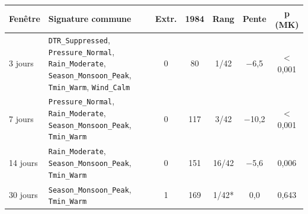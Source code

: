 \footnotesize
\begin{tabular}{l>{\raggedright\arraybackslash}p{4.6cm}ccccc}
\toprule
\rowcolor{NuitBleue!90}
\color{white}\textbf{Fenêtre} & \color{white}\textbf{Signature commune} & \color{white}\textbf{Extr.} & \color{white}\textbf{1984} & \color{white}\textbf{Rang} & \color{white}\textbf{Pente} & \color{white}\textbf{p (MK)} \\
\midrule
3 jours & \texttt{DTR\_Suppressed}, \texttt{Pressure\_Normal}, \texttt{Rain\_Moderate}, \texttt{Season\_Monsoon\_Peak}, \texttt{Tmin\_Warm}, \texttt{Wind\_Calm} & 0 & 80 & 1/42 & $-$6,5 & $<$ 0,001 \\
7 jours & \texttt{Pressure\_Normal}, \texttt{Rain\_Moderate}, \texttt{Season\_Monsoon\_Peak}, \texttt{Tmin\_Warm} & 0 & 117 & 3/42 & $-$10,2 & $<$ 0,001 \\
14 jours & \texttt{Rain\_Moderate}, \texttt{Season\_Monsoon\_Peak}, \texttt{Tmin\_Warm} & 0 & 151 & 16/42 & $-$5,6 & 0,006 \\
30 jours & \texttt{Season\_Monsoon\_Peak}, \texttt{Tmin\_Warm} & 1 & 169 & 1/42* & 0,0 & 0,643 \\
\bottomrule
\end{tabular}
